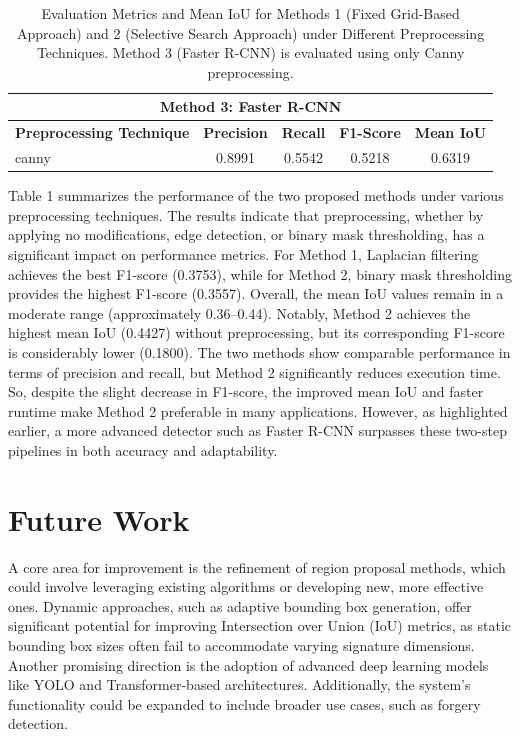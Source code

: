 \documentclass[a4paper,12pt]{article}
\begin{document}
\begin{table}[ht]
\begin{tabular}{|l|c|c|c|c|}
    \hline
    \multicolumn{5}{|c|}{\textbf{Method 3: Faster R-CNN}} \\ \hline
    \textbf{Preprocessing Technique} & \textbf{Precision} & \textbf{Recall} & \textbf{F1-Score} & \textbf{Mean IoU} \\ \hline
    canny             & 0.8991             & 0.5542          & 0.5218            & 0.6319            \\ \hline
    \end{tabular}
\caption{\centering Evaluation Metrics and Mean IoU for Methods 1 (Fixed Grid-Based Approach) and 2 (Selective Search Approach) under Different Preprocessing Techniques. Method 3 (Faster R-CNN) is evaluated using only Canny preprocessing.}
\end{table}

Table 1 summarizes the performance of the two proposed methods under various preprocessing techniques. The results indicate that preprocessing, whether by applying no modifications, edge detection, or binary mask thresholding, has a significant impact on performance metrics. For Method 1, Laplacian filtering achieves the best F1-score (0.3753), while for Method 2, binary mask thresholding provides the highest F1-score (0.3557). Overall, the mean IoU values remain in a moderate range (approximately 0.36–0.44). Notably, Method 2 achieves the highest mean IoU (0.4427) without preprocessing, but its corresponding F1-score is considerably lower (0.1800).  The two methods show comparable performance in terms of precision and recall, but Method 2 significantly reduces execution time. So, despite the slight decrease in F1-score, the improved mean IoU and faster runtime make Method 2 preferable in many applications. However, as highlighted earlier, a more advanced detector such as Faster R-CNN surpasses these two-step pipelines in both accuracy and adaptability.

\section{Future Work}
A core area for improvement is the refinement of region proposal methods, which could involve leveraging existing algorithms or developing new, more effective ones. Dynamic approaches, such as adaptive bounding box generation, offer significant potential for improving Intersection over Union (IoU) metrics, as static bounding box sizes often fail to accommodate varying signature dimensions. Another promising direction is the adoption of advanced deep learning models like YOLO and Transformer-based architectures. Additionally, the system's functionality could be expanded to include broader use cases, such as forgery detection.
\end{document}
